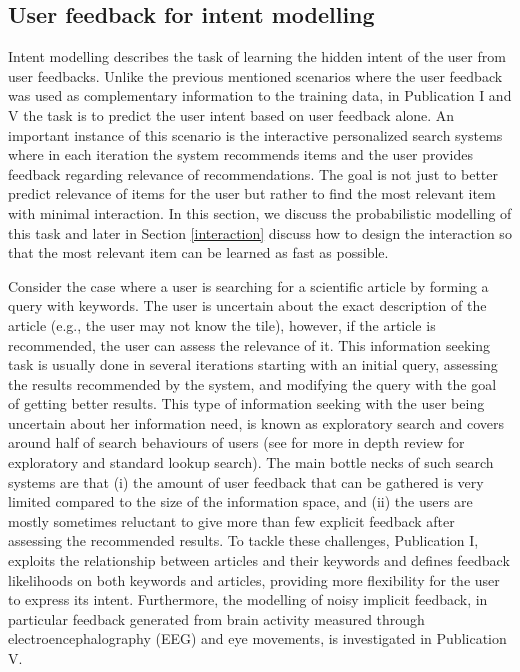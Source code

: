 \documentclass[dissertation,math,vertlayout,pdfa,colorlinks]{aaltoseries}
\begin{document}


\subsection{User feedback for intent modelling} 
Intent modelling describes the task of learning the hidden intent of the user from user feedbacks. Unlike the previous mentioned scenarios where the user feedback was used as complementary information to the training data, in Publication I and V the task is to predict the user intent based on user feedback alone. An important instance of this scenario is the interactive personalized search systems where in each iteration the system recommends items and the user provides feedback regarding relevance of recommendations. The goal is not just to better predict relevance of items for the user but rather to find the most relevant item with minimal interaction. In this section, we discuss the probabilistic modelling of this task and later in Section \ref{interaction} discuss how to design the interaction so that the most relevant item can be learned as fast as possible. 

Consider the case where a user is searching for a scientific article by forming a query with keywords. The user is uncertain about the exact description of the article (e.g., the user may not know the tile), however, if the article is recommended, the user can assess the relevance of it. This information seeking task is usually done in several iterations starting with an initial query, assessing the results recommended by the system, and modifying the query with the goal of getting better results. This type of information seeking with the user being uncertain about her information need, is known as exploratory search \cite{Marchionini2006,white2009exploratory} and covers around half of search behaviours of users \cite{Teevan_2004} (see \cite{paba_exploratory_vs_lookup} for more in depth review for exploratory and standard lookup search). The main bottle necks of such search systems are that (i) the amount of user feedback that can be gathered is very limited compared to the size of the information space, and (ii) the users are mostly sometimes reluctant to give more than few explicit feedback after assessing the recommended results. To tackle these challenges, Publication I, exploits the relationship between articles and their keywords and defines feedback likelihoods on both keywords and articles, providing more flexibility for the user to express its intent. Furthermore, the modelling of noisy implicit feedback, in particular feedback generated from brain activity measured through electroencephalography (EEG) and eye movements, is investigated in Publication V.  
\end{document}
